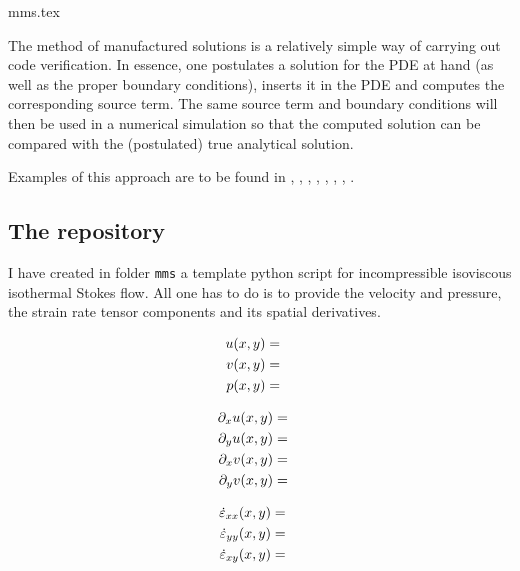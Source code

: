 \begin{flushright} {\tiny {\color{gray} mms.tex}} \end{flushright}

The method of manufactured solutions is a relatively simple way of carrying out
code verification. In essence, one postulates a solution for the PDE at hand (as
well as the proper boundary conditions), inserts it in the PDE and computes the 
corresponding source term. 
The same source term and boundary conditions will then be used in a numerical 
simulation so that the computed solution can be compared with the (postulated)
true analytical solution. 

Examples of this approach are to be found in 
\textcite{dohu03}, \textcite{busa13}, \textcite{bodg06}, \textcite{polp14},
\textcite{polp14b}, \textcite{lopp14}, \textcite{blmp16}, \textcite{thba22}.

\subsection{The repository}

I have created in folder {\tt mms} a template python script for incompressible
isoviscous isothermal Stokes flow. All one has to do is to provide the velocity and 
pressure, the strain rate tensor components and its spatial derivatives.




\begin{eqnarray}
u(x,y) &=&  \nonumber\\
v(x,y) &=&  \nonumber\\
p(x,y) &=&  \nonumber
\end{eqnarray}

\begin{eqnarray}
\partial_x u (x,y)&=& \nonumber\\
\partial_y u (x,y)&=& \nonumber\\
\partial_x v (x,y)&=& \nonumber\\
\partial_y v (x,y)&=& \nonumber
\end{eqnarray}

\begin{eqnarray}
\dot\varepsilon_{xx}(x,y) &=&  \nonumber\\
\dot\varepsilon_{yy}(x,y) &=&  \nonumber\\
\dot\varepsilon_{xy}(x,y) &=&  \nonumber
\end{eqnarray}

